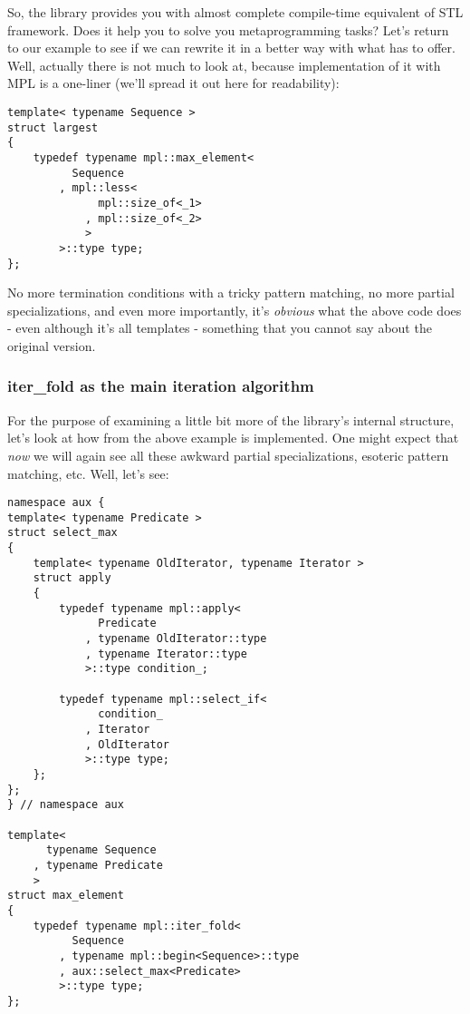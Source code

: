 \documentclass{kapproc}
\begin{document}
So, the library provides you with almost complete compile-time 
equivalent of STL framework. Does it help you to solve you 
metaprogramming tasks? Let's return to our  
example to see if we can rewrite it in a better way with what 
 has to offer. Well, actually there is not 
much to look at, because implementation of it with MPL is a 
one-liner (we'll spread it out here for readability):

{\small
\begin{codesamp}\begin{verbatim}
template< typename Sequence >
struct largest
{
    typedef typename mpl::max_element<
          Sequence
        , mpl::less<
              mpl::size_of<_1>
            , mpl::size_of<_2>
            >
        >::type type;
};
\end{verbatim}
\end{codesamp}
}

No more termination conditions with a tricky pattern matching, 
no more partial specializations, and even more importantly, 
it's \emph{obvious} what the above code does - even although 
it's all templates - something that you cannot say about the 
original version.

\subsubsection{iter\_fold as the main iteration 
algorithm}

For the purpose of examining a little bit more of the library's
internal structure, let's look at how  from the
above example is implemented. One might expect that \emph{now} we will
again see all these awkward partial specializations, esoteric pattern
matching, etc. Well, let's see:

{\small
\begin{codesamp}\begin{verbatim}
namespace aux {
template< typename Predicate >
struct select_max
{
    template< typename OldIterator, typename Iterator >
    struct apply
    {
        typedef typename mpl::apply<
              Predicate
            , typename OldIterator::type
            , typename Iterator::type
            >::type condition_;

        typedef typename mpl::select_if<
              condition_
            , Iterator
            , OldIterator
            >::type type;
    };
};
} // namespace aux 

template<
      typename Sequence
    , typename Predicate
    >
struct max_element
{
    typedef typename mpl::iter_fold<    
          Sequence
        , typename mpl::begin<Sequence>::type
        , aux::select_max<Predicate>
        >::type type;
};
\end{verbatim}
\end{codesamp}
}
\end{document}
